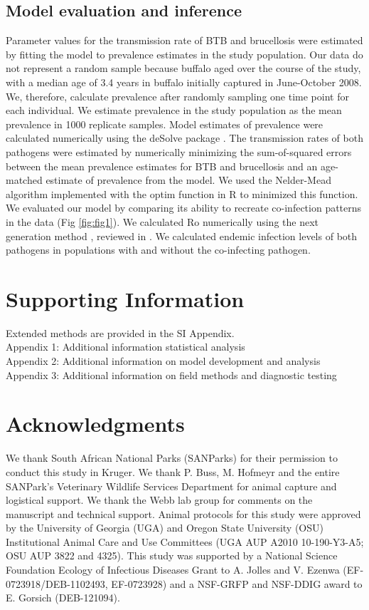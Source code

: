 \documentclass[10pt,letterpaper]{article}
\begin{document}
\subsection*{Model evaluation and inference}
Parameter values for the transmission rate of BTB and brucellosis were estimated by fitting the model to prevalence estimates in the study population. Our data do not represent a random sample because buffalo aged over the course of the study, with a median age of 3.4 years in buffalo initially captured in June-October 2008. We, therefore,  calculate prevalence after randomly sampling one time point for each individual.  We estimate prevalence in the study population as the mean prevalence in 1000 replicate samples. Model estimates of prevalence were calculated numerically using the deSolve package \cite{desolve_package}. The transmission rates of both pathogens were estimated by numerically minimizing the sum-of-squared errors between the mean prevalence estimates for BTB and brucellosis and an age-matched estimate of prevalence from the model. We used the Nelder-Mead algorithm implemented with the optim function in R to minimized this function. We evaluated our model by comparing its ability to recreate co-infection patterns in the data (Fig \ref{fig:fig1}). We calculated Ro numerically using the next generation method \cite{van_den_driessche_reproduction_2002}, reviewed in \cite{heffernan_perspectives_2005}. We calculated endemic infection levels of both pathogens in populations with and without the co-infecting pathogen.

\section*{Supporting Information}
Extended methods are provided in the SI Appendix. \\
\noindent{}Appendix 1: Additional information statistical analysis \\
\noindent{}Appendix 2: Additional information on model development and analysis \\
\noindent{}Appendix 3: Additional information on field methods and diagnostic testing \\


\section*{Acknowledgments}
We thank South African National Parks (SANParks) for their permission to conduct this study in Kruger. We thank P. Buss, M. Hofmeyr and the entire SANPark’s Veterinary Wildlife Services Department for animal capture and logistical support. We thank the Webb lab group for comments on the manuscript and technical support. Animal protocols for this study were approved by the University of Georgia (UGA) and Oregon State University (OSU) Institutional Animal Care and Use Committees (UGA AUP A2010 10-190-Y3-A5; OSU AUP 3822 and 4325). This study was supported by a National Science Foundation Ecology of Infectious Diseases Grant to A. Jolles and V. Ezenwa (EF-0723918/DEB-1102493, EF-0723928) and a NSF-GRFP and NSF-DDIG award to E. Gorsich (DEB-121094).
\nolinenumbers




\end{document}
